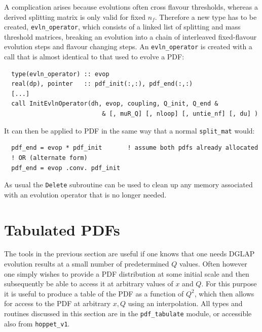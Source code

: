 \documentclass[12pt]{article}
\newcommand{\ttt}[1]{\texttt{#1}}
\begin{document}
A complication arises because evolutions often cross flavour
thresholds, whereas a derived splitting matrix is only valid for fixed
$n_f$. Therefore a new type has to be created, \ttt{evln\_operator},
which consists of a linked list of splitting and mass threshold
matrices, breaking an evolution into a chain of interleaved
fixed-flavour evolution steps and flavour changing steps. An
\ttt{evln\_operator} is created with a call that is almost identical
to that used to evolve a PDF:
\begin{verbatim}
  type(evln_operator) :: evop
  real(dp), pointer   :: pdf_init(:,:), pdf_end(:,:)
  [...]
  call InitEvlnOperator(dh, evop, coupling, Q_init, Q_end &
                           & [, muR_Q] [, nloop] [, untie_nf] [, du] )
\end{verbatim}
It can then be applied to PDF in the same way that a normal
\ttt{split\_mat} would:
\begin{verbatim}
  pdf_end = evop * pdf_init       ! assume both pdfs already allocated
  ! OR (alternate form) 
  pdf_end = evop .conv. pdf_init  
\end{verbatim}
As usual the \ttt{Delete} subroutine can be used to clean up any
memory associated with an evolution operator that is no longer needed.


\section{Tabulated PDFs}
\label{sec:tabulated-pdfs}

The tools in the previous section are useful if one knows that one
needs DGLAP evolution results at a small number of predetermined $Q$
values. Often however one simply wishes to provide a PDF distribution
at some initial scale and then subsequently be able to access it at
arbitrary values of $x$ and $Q$. For this purpose it is useful to
produce a table of the PDF as a function of $Q^2$, which then allows
for access to the PDF at arbitrary $x, Q$ using an interpolation. All
types and routines discussed in this section are in the
\ttt{pdf\_tabulate} module, or accessible also from \ttt{hoppet\_v1}.
\end{document}
